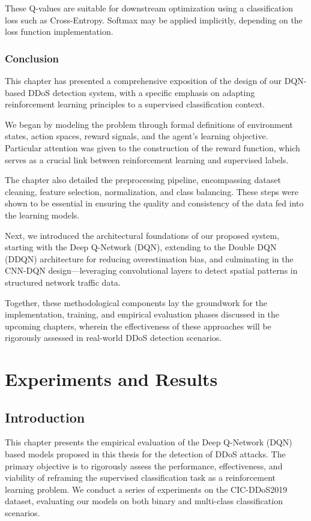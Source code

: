 \documentclass{report}
\begin{document}
These Q-values are suitable for downstream optimization using a classification loss such as Cross-Entropy. Softmax may be applied implicitly, depending on the loss function implementation.

\subsection{Conclusion}

This chapter has presented a comprehensive exposition of the design of our DQN-based DDoS detection system, with a specific emphasis on adapting reinforcement learning principles to a supervised classification context. 

We began by modeling the problem through formal definitions of environment states, action spaces, reward signals, and the agent's learning objective. Particular attention was given to the construction of the reward function, which serves as a crucial link between reinforcement learning and supervised labels.

The chapter also detailed the preprocessing pipeline, encompassing dataset cleaning, feature selection, normalization, and class balancing. These steps were shown to be essential in ensuring the quality and consistency of the data fed into the learning models.

Next, we introduced the architectural foundations of our proposed system, starting with the Deep Q-Network (DQN), extending to the Double DQN (DDQN) architecture for reducing overestimation bias, and culminating in the CNN-DQN design—leveraging convolutional layers to detect spatial patterns in structured network traffic data.

Together, these methodological components lay the groundwork for the implementation, training, and empirical evaluation phases discussed in the upcoming chapters, wherein the effectiveness of these approaches will be rigorously assessed in real-world DDoS detection scenarios.



\chapter{Experiments and Results}
\label{chap:experiments}

\section{Introduction}
This chapter presents the empirical evaluation of the Deep Q-Network (DQN) based models proposed in this thesis for the detection of DDoS attacks. The primary objective is to rigorously assess the performance, effectiveness, and viability of reframing the supervised classification task as a reinforcement learning problem. We conduct a series of experiments on the CIC-DDoS2019 dataset, evaluating our models on both binary and multi-class classification scenarios.
\end{document}
